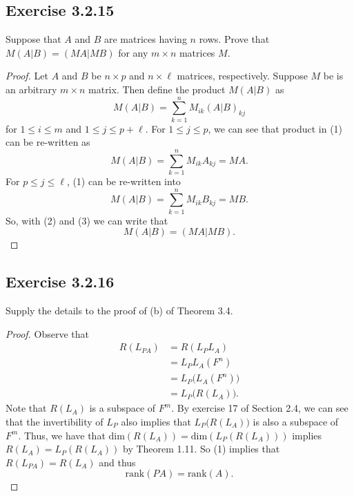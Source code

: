 \subsection*{Exercise 3.2.15} Suppose that \( A   \) and \( B  \) are matrices having \( n  \) rows. Prove that \( M(A|B) = (MA|MB) \) for any \( m \times n  \) matrices \( M  \).
\begin{proof}
Let \( A  \) and \( B  \) be \( n \times p  \) and \( n \times \ell  \) matrices, respectively. Suppose \( M  \) be is an arbitrary \( m \times n  \) matrix. Then define the product \( M (A | B ) \) as 
\[  M (A|B) = \sum_{ k =1  }^{ n  } {M}_{ik } (A | B)_{kj} \tag{1} \]
for \( 1 \leq i \leq m  \) and \( 1 \leq j \leq  p + \ell  \). For \( 1 \leq j \leq p  \), we can see that product in (1) can be re-written as
\[  M (A|B) = \sum_{ k= 1  }^{ n } {M}_{ik } {A}_{kj} = MA. \tag{2} \]
For \( p \leq j \leq \ell  \), (1) can be re-written into
\[  M (A|B) = \sum_{ k=1  }^{ n } {M}_{ik } {B}_{kj} = MB. \tag{3} \]
So, with (2) and (3) we can write that
\[  M (A|B) = (MA | MB). \]
\end{proof}

\subsection*{Exercise 3.2.16} Supply the details to the proof of (b) of Theorem 3.4.
\begin{proof}
Observe that
\begin{align*}
   R({L}_{PA}) &= R({L}_{P} {L}_{A}) \\
               &=  {L}_{P} {L}_{A}(F^{n}) \\
               &= {L}_{P} \Big( {L}_{A} (F^{n}) \Big) \\
               &= {L}_{P} \Big(  R( {L}_{A}) \Big). \tag{1}
\end{align*}
Note that \( R({L}_{A})  \) is a subspace of \( F^{m} \). By exercise 17 of Section 2.4, we can see that the invertibility of \( {L}_{P} \) also implies that \( {L}_{P}\Big(R({L}_{A})\Big) \) is also a subspace of \( F^{m} \). Thus, we have that \( \text{dim}(R({L}_{A})) = \text{dim}({L}_{P}({R}({L}_{A}))) \) implies \( R({L}_{A}) = {L}_{P}(R({L}_{A})) \) by Theorem 1.11. So (1) implies that \( R({L}_{PA}) = R({L}_{A})   \) and thus \[ \text{rank}(PA) = \text{rank}(A). \]
\end{proof}

